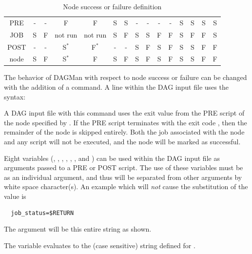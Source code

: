 \begin{itemize}
\begin{center}
\begin{table}[hbt]
\begin{tabular}{|c||cccccccccccccc|} \hline
PRE   & - & - & F          & F          & S & S & - & - & - & - & S & S & S & S  \\
JOB   & S & F & not run    & not run    & S & F & S & S & F & F & S & F & F & S  \\
POST  & - & - & S${}^\ast$ & F${}^\ast$ & - & - & S & F & S & F & S & S & F & F  \\
\hline \hline
node  & S & F & S${}^\ast$ & F          & S & F & S & F & S & F & S & S & F & F  \\
\hline
\end{tabular}
\caption{\label{Node-success-failure}Node success or failure definition }
\end{table}
\end{center}

The behavior of DAGMan with respect to node success or failure can be changed 
with the addition of a  command. 
A  line within the DAG input file uses the syntax: 

  

A DAG input file with this command uses the exit value from the
PRE script of the node specified by . 
If the PRE script terminates with the exit code ,
then the remainder of the node is skipped entirely.  
Both the job associated with the node and
any  script will not be executed,
and the node will be marked as successful.

Eight variables (, , ,
, , ,
 and ) can be used within the DAG input
file as arguments passed to a PRE or POST script. 
The use of these variables must be as an individual argument,
and thus will be separated from other arguments by white space character(s).
An example which will \emph{not} cause the substitution of 
the  value is
\begin{verbatim}
  job_status=$RETURN 
\end{verbatim}
The argument will be this entire string as shown.

The variable  evaluates to the (case sensitive) string
defined for .


\end{itemize}
